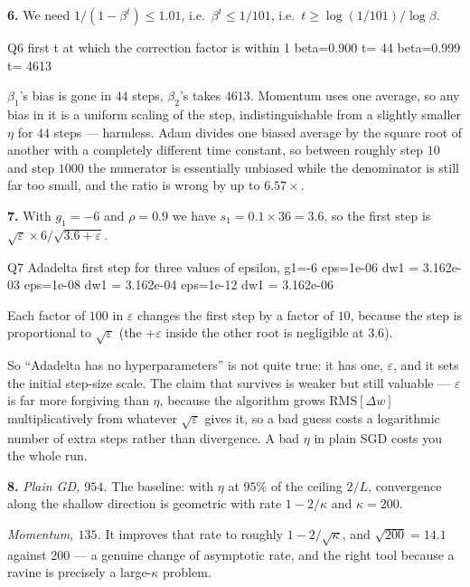 \documentclass[11pt]{article}
\begin{document}
\medskip
\textbf{6.} We need $1/(1-\beta^t) \le 1.01$, i.e.\ $\beta^t \le 1/101$, i.e.\
$t \ge \log(1/101)/\log\beta$.

\begin{codeout}
Q6  first t at which the correction factor is within 1%
    beta=0.900  t=   44
    beta=0.999  t= 4613
\end{codeout}

$\beta_1$'s bias is gone in $44$ steps, $\beta_2$'s takes $4613$. Momentum uses
one average, so any bias in it is a uniform scaling of the step,
indistinguishable from a slightly smaller $\eta$ for $44$ steps --- harmless.
Adam divides one biased average by the square root of another with a completely
different time constant, so between roughly step $10$ and step $1000$ the
numerator is essentially unbiased while the denominator is still far too small,
and the ratio is wrong by up to $6.57\times$.

\medskip
\textbf{7.} With $g_1 = -6$ and $\rho = 0.9$ we have
$s_1 = 0.1 \times 36 = 3.6$, so the first step is
$\sqrt{\varepsilon} \times 6/\sqrt{3.6+\varepsilon}$.

\begin{codeout}
Q7  Adadelta first step for three values of epsilon, g1=-6
    eps=1e-06   dw1 = 3.162e-03
    eps=1e-08   dw1 = 3.162e-04
    eps=1e-12   dw1 = 3.162e-06

\end{codeout}

Each factor of $100$ in $\varepsilon$ changes the first step by a factor of
$10$, because the step is proportional to $\sqrt{\varepsilon}$ (the
$+\varepsilon$ inside the other root is negligible at $3.6$).

So ``Adadelta has no hyperparameters'' is not quite true: it has one,
$\varepsilon$, and it sets the initial step-size scale. The claim that survives
is weaker but still valuable --- $\varepsilon$ is far more forgiving than
$\eta$, because the algorithm grows $\mathrm{RMS}[\Delta w]$ multiplicatively
from whatever $\sqrt{\varepsilon}$ gives it, so a bad guess costs a logarithmic
number of extra steps rather than divergence. A bad $\eta$ in plain SGD costs
you the whole run.

\medskip
\textbf{8.} \emph{Plain GD, $954$.} The baseline: with $\eta$ at $95\%$ of the ceiling
$2/L$, convergence along the shallow direction is geometric with rate
$1-2/\kappa$ and $\kappa = 200$.

\emph{Momentum, $135$.} It improves that rate to roughly $1-2/\sqrt{\kappa}$,
and $\sqrt{200} = 14.1$ against $200$ --- a genuine change of asymptotic rate,
and the right tool because a ravine is precisely a large-$\kappa$ problem.
\end{document}
